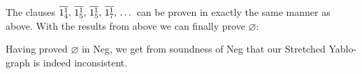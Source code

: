 The clauses $\ol{1^1_4},\,\ol{1^1_5},\,\ol{1^1_5},\,\ol{1^1_7},\,\dots$ can be proven in exactly the same manner as above.
With the results from above we can finally prove $\varnothing$:
\begin{prooftree*}
  \Hypo{\dots}
\end{prooftree*}

Having proved $\varnothing$ in Neg, we get from soundness of Neg that our Stretched Yablo-graph is indeed inconsistent.
